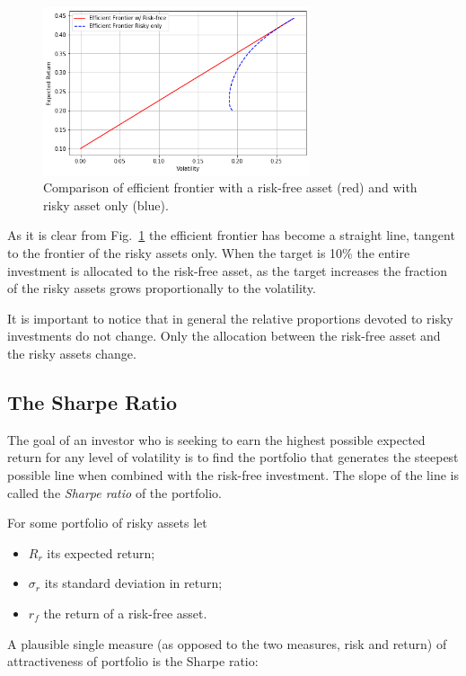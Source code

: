 \begin{figure}[htb]
\centering
    \includegraphics[width=0.7\textwidth]{figures/cal.png}
    \caption{Comparison of efficient frontier with a risk-free asset (red) and with risky asset only (blue).}
    \label{fig:cal}
\end{figure}
    
As it is clear from Fig.~\ref{fig:cal} the efficient frontier has become a
straight line, tangent to the frontier of the risky assets only. When
the target is 10\% the entire investment is allocated to the risk-free
asset, as the target increases the fraction of the risky assets grows
proportionally to the volatility. 

It is important to notice that in general the relative proportions
devoted to risky investments do not change. Only the allocation between
the risk-free asset and the risky assets change.

\subsection{The Sharpe Ratio}
\label{the-sharpe-ratio}
The goal of an investor who is seeking to earn the highest possible expected return for any 
level of volatility is to find the portfolio that generates the steepest possible line
when combined with the risk-free investment. The slope of the line is called the \emph{Sharpe ratio} of the portfolio.

For some portfolio of risky assets let

\begin{itemize}
\tightlist
\item
  \(R_r\) its expected return;
\item
  \(\sigma_r\) its standard deviation in return;
\item
  \(r_f\) the return of a risk-free asset.
\end{itemize}

A plausible single measure (as opposed to the two measures, risk and
return) of attractiveness of portfolio is the Sharpe ratio:

